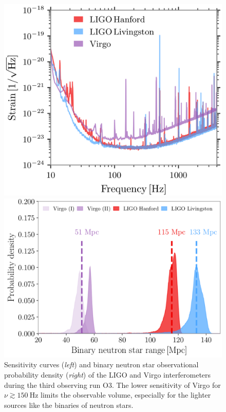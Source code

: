 \documentclass[a4paper,titlepage]{book}     	%
\begin{document}
\begin{figure}[h]
	\begin{minipage}{.47\textwidth}
		\centering
		\includegraphics[width=\textwidth]{./images/sensitivity.png}
	\end{minipage}
	\hfill
	\begin{minipage}{.53\textwidth}
		\centering
		\includegraphics[width=1.02\textwidth]{./images/O3BNSrange.png}	
	\end{minipage}
	\caption{Sensitivity curves (\emph{left}) and binary neutron star observational probability density (\emph{right}) of the LIGO and Virgo interferometers during the third observing run O3. The lower sensitivity of Virgo for $\nu \gtrsim 150~\text{Hz}$ limits the observable volume, especially for the lighter sources like the binaries of neutron stars. \cite{GWTC-3}}\label{fig:O3sensitivity}
\end{figure}
\end{document}
